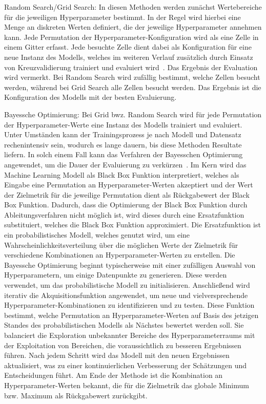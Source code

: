 \begin{description}
    \item Random Search/Grid Search: In diesen Methoden werden zunächst Wertebereiche für die jeweiligen Hyperparameter bestimmt. In der Regel wird hierbei eine Menge an diskreten Werten definiert, die der jeweilige Hyperparameter annehmen kann. Jede Permutation der Hyperparameter-Konfiguration wird als eine Zelle in einem Gitter erfasst. 
    Jede besuchte Zelle dient dabei als Konfiguration für eine neue Instanz des Modells, welches im weiteren Verlauf zusätzlich durch Einsatz von Kreuzvalidierung trainiert und evaluiert wird~\cite[S. 3]{DBLP:journals/corr/abs-1912-06059}. Das Ergebnis der Evaluation wird vermerkt.
    Bei Random Search wird zufällig bestimmt, welche Zellen besucht werden, während bei Grid Search alle Zellen besucht werden. Das Ergebnis ist die Konfiguration des Modells mit der besten Evaluierung.
    
    \item Bayessche Optimierung: Bei Grid bwz. Random Search wird für jede Permutation der Hyperparameter-Werte eine Instanz des Modells trainiert und evaluiert. Unter Umständen kann der Trainingsprozess je nach Modell und Datensatz rechenintensiv sein, wodurch es lange dauern, bis diese Methoden Resultate liefern.
    In solch einem Fall kann das Verfahren der Bayesschen Optimierung angewendet, um die Dauer der Evaluierung zu verkürzen~\cite[S. 2 - 3]{snoek2012practical}. Im Kern wird das Machine Learning Modell als Black Box Funktion interpretiert, welches als Eingabe eine Permutation an Hyperparameter-Werten akzeptiert und der Wert der Zielmetrik für die jeweilige Permutation dient als Rückgabewert der Black Box Funktion.
    Dadurch, dass die Optimierung der Black Box Funktion durch Ableitungsverfahren nicht möglich ist, wird dieses durch eine Ersatzfunktion substituiert, welches die Black Box Funktion approximiert.
    Die Ersatzfunktion ist ein probabilistisches Modell, welches genutzt wird, um eine Wahrscheinlichkeitsverteilung über die möglichen Werte der Zielmetrik für verschiedene Kombinationen an Hyperparameter-Werten zu erstellen.
    Die Bayessche Optimierung beginnt typischerweise mit einer zufälligen Auswahl von Hyperparametern, um einige Datenpunkte zu generieren. Diese werden verwendet, um das probabilistische Modell zu initialisieren. Anschließend wird iterativ die Akquisitionsfunktion angewendet, um neue und vielversprechende Hyperparameter-Kombinationen zu identifizieren und zu testen. 
    Diese Funktion bestimmt, welche Permutation an Hyperparameter-Werten auf Basis des jetzigen Standes des probabilistischen Modells als Nächstes bewertet werden soll. 
    Sie balanciert die Exploration unbekannter Bereiche des Hyperparameterraums mit der Exploitation von Bereichen, die voraussichtlich zu besseren Ergebnissen führen.
    Nach jedem Schritt wird das Modell mit den neuen Ergebnissen aktualisiert, was zu einer kontinuierlichen Verbesserung der Schätzungen und Entscheidungen führt. Am Ende der Methode ist die Kombination an Hyperparameter-Werten bekannt, die für die Zielmetrik das globale Minimum bzw. Maximum als Rückgabewert zurückgibt.


\end{description}
